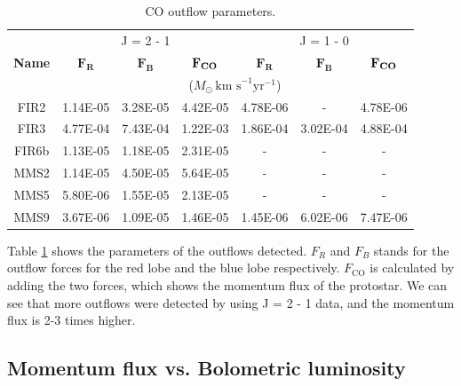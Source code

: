 \begin{table}[h]
	\caption{CO outflow parameters.} \label{result}
	\begin{center}
		\begin{tabular}{c|c|c|c||c|c|c}
			\toprule
			\multirow{3}{1cm}{\textbf{Name}} & \multicolumn{3}{c}{J = 2 - 1} & \multicolumn{3}{c}{J = 1 - 0} \\
			& $\mathbf{F_{R}}$ & $\mathbf{F_{B}}$ & $\mathbf{F_{\textrm{\textbf{CO}}}}$ & $\mathbf{F_{R}}$ & $\mathbf{F_{B}}$ & $\mathbf{F_{\textrm{\textbf{CO}}}}$\\
			& \multicolumn{6}{c}{($M_{\odot} \, \textrm{km s}^{-1} \textrm{yr}^{-1}$)}\\
			\midrule
			FIR2 & 1.14E-05 & 3.28E-05 & 4.42E-05 & 4.78E-06 & - & 4.78E-06\\
			FIR3 & 4.77E-04 & 7.43E-04 & 1.22E-03 & 1.86E-04 & 3.02E-04 & 4.88E-04\\
			FIR6b & 1.13E-05 & 1.18E-05 & 2.31E-05 & - & - & -\\
			MMS2 & 1.14E-05 & 4.50E-05 & 5.64E-05 & - & - & -\\
			MMS5 & 5.80E-06 & 1.55E-05 & 2.13E-05 & - & - & -\\
			MMS9 & 3.67E-06 & 1.09E-05 & 1.46E-05 & 1.45E-06 & 6.02E-06 & 7.47E-06\\
			\toprule
		\end{tabular}
	\end{center}
\end{table}


Table \noindent\ref{result} shows the parameters of the outflows detected. $F_R$ and $F_B$ stands for the outflow forces for the red lobe and the blue lobe respectively. $F_{\textrm{CO}}$ is calculated by adding the two forces, which shows the momentum flux of the protostar. We can see that more outflows were detected by using J = 2 - 1 data, and the momentum flux is 2-3 times higher.\\

\clearpage
\newpage
\subsection{Momentum flux vs. Bolometric luminosity}


